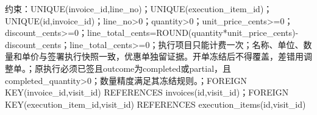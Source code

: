 \documentclass[UTF8,12pt,a4paper,fontset=none]{ctexart}
\begin{document}
约束：UNIQUE(\allowbreak{}invoice\_\allowbreak{}id,\allowbreak{}line\_\allowbreak{}no)\allowbreak{}；UNIQUE(\allowbreak{}execution\_\allowbreak{}item\_\allowbreak{}id)\allowbreak{}；UNIQUE(\allowbreak{}id,\allowbreak{}invoice\_\allowbreak{}id)\allowbreak{}；line\_\allowbreak{}no>\allowbreak{}0；quantity>\allowbreak{}0；unit\_\allowbreak{}price\_\allowbreak{}cents>\allowbreak{}=\allowbreak{}0；discount\_\allowbreak{}cents>\allowbreak{}=\allowbreak{}0；line\_\allowbreak{}total\_\allowbreak{}cents=\allowbreak{}ROUND(\allowbreak{}quantity*\allowbreak{}unit\_\allowbreak{}price\_\allowbreak{}cents)\allowbreak{}-\allowbreak{}discount\_\allowbreak{}cents；line\_\allowbreak{}total\_\allowbreak{}cents>\allowbreak{}=\allowbreak{}0；执行项目只能计费一次；名称、单位、数量和单价与签署执行快照一致，优惠单独留证据。开单冻结后不得覆盖，差错用调整单。；原执行必须已签且outcome为completed或partial，且completed\_\allowbreak{}quantity>\allowbreak{}0；数量精度满足其冻结规则。；FOREIGN KEY(\allowbreak{}invoice\_\allowbreak{}id,\allowbreak{}visit\_\allowbreak{}id)\allowbreak{} REFERENCES invoices(\allowbreak{}id,\allowbreak{}visit\_\allowbreak{}id)\allowbreak{}；FOREIGN KEY(\allowbreak{}execution\_\allowbreak{}item\_\allowbreak{}id,\allowbreak{}visit\_\allowbreak{}id)\allowbreak{} REFERENCES execution\_\allowbreak{}items(\allowbreak{}id,\allowbreak{}visit\_\allowbreak{}id)\allowbreak{}\par
\Needspace{574pt}
\end{document}
